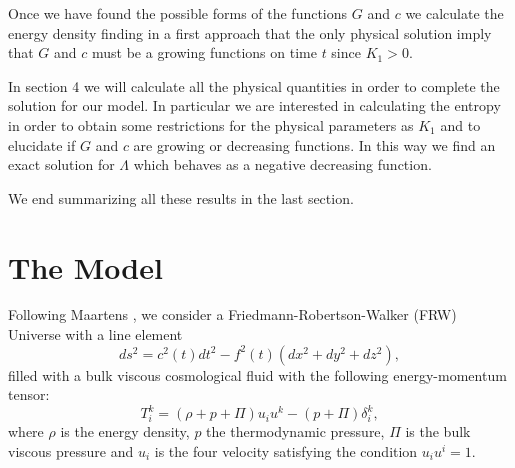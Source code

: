 \documentclass{revtex4}
\begin{document}

Once we have found the possible forms of the functions $G$ and $c$ we
calculate the energy density finding in a first approach that the only
physical solution imply that $G$ and $c$ must be a growing functions on time
$t$ since $K_{1}>0.$

In section 4 we will calculate all the physical quantities in order to
complete the solution for our model. In particular we are interested in
calculating the entropy in order to obtain some restrictions for the
physical parameters as $K_{1}$ and to elucidate if $G$ and $c$ are growing
or decreasing functions. In this way we find an exact solution for $\Lambda $
which behaves as a negative decreasing function.

We end summarizing all these results in the last section.

\section{The Model\label{M}}

Following Maartens \cite{Ma95}, we consider a Friedmann-Robertson-Walker
(FRW) Universe with a line element
\begin{equation}
ds^{2}=c^{2}(t)dt^{2}-f^{2}(t)\left( dx^{2}+dy^{2}+dz^{2}\right) ,
\label{line}
\end{equation}
filled with a bulk viscous cosmological fluid with the following
energy-momentum tensor:
\begin{equation}
T_{i}^{k}=\left( \rho +p+\Pi \right) u_{i}u^{k}-\left( p+\Pi \right) \delta
_{i}^{k},  \label{1}
\end{equation}
where $\rho $ is the energy density, $p$ the thermodynamic pressure, $\Pi $
is the bulk viscous pressure and $u_{i}$ is the four velocity satisfying the
condition $u_{i}u^{i}=1$.
\end{document}
